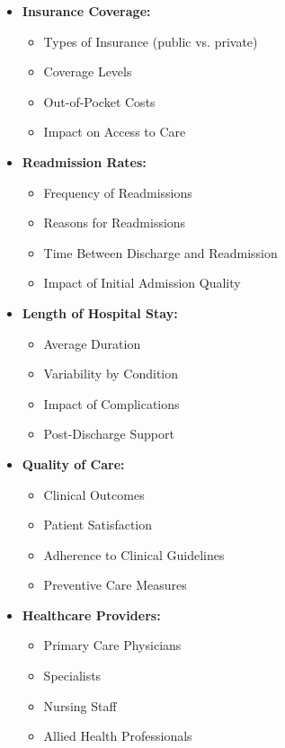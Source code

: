 \documentclass{article}
\begin{document}
\begin{itemize}
    \item \textbf{Insurance Coverage:}
    \begin{itemize}
        \item Types of Insurance (public vs. private)
        \item Coverage Levels
        \item Out-of-Pocket Costs
        \item Impact on Access to Care
    \end{itemize}
    
    \item \textbf{Readmission Rates:}
    \begin{itemize}
        \item Frequency of Readmissions
        \item Reasons for Readmissions
        \item Time Between Discharge and Readmission
        \item Impact of Initial Admission Quality
    \end{itemize}
    
    \item \textbf{Length of Hospital Stay:}
    \begin{itemize}
        \item Average Duration
        \item Variability by Condition
        \item Impact of Complications
        \item Post-Discharge Support
    \end{itemize}
    
    \item \textbf{Quality of Care:}
    \begin{itemize}
        \item Clinical Outcomes
        \item Patient Satisfaction
        \item Adherence to Clinical Guidelines
        \item Preventive Care Measures
    \end{itemize}
    
    \item \textbf{Healthcare Providers:}
    \begin{itemize}
        \item Primary Care Physicians
        \item Specialists
        \item Nursing Staff
        \item Allied Health Professionals
    \end{itemize}
    

\end{itemize}
\end{document}
